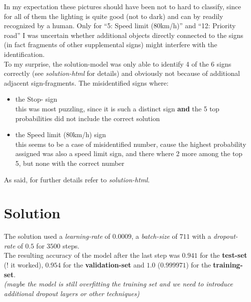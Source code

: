 \documentclass[a4paper]{article}
\begin{document}
In my expectation these pictures should have been not to hard to classify, since
for all of them the lighting is quite good (not to dark) and can by readily recognized by a human.
Only for \enquote{5: Speed limit (80km/h)} and \enquote{12: Priority road} I was uncertain
whether additional objects directly connected to the signs (in fact fragments of other supplemental signs)
might interfere with the identification.
\\
To my surprise, the solution-model was only able to identify 4 of the 6 signs correctly
(see \textit{solution-html} for details) and obviously not because of additional adjacent sign-fragments.
The misidentified signs where:
\begin{itemize}
\item the Stop- sign \\
this was most puzzling, since it is such a distinct sign \textbf{and} the 5 top probabilities did not include the correct solution
\item the Speed limit (80km/h) sign \\
this seems to be a case of misidentified number, cause the highest probability assigned was also a speed limit sign,
and there where 2 more among the top 5, but none with the correct number
\end{itemize}

As said, for further details refer to \textit{solution-html}.

\section{Solution}

The solution used a \textit{learning-rate} of $0.0009$, a \textit{batch-size} of $711$
with a \textit{dropout-rate} of $0.5$ for $3500$ steps.\\
The resulting accuracy of the model after the last step was $0.941$ for the
\textbf{test-set} (! it worked), $0.954$ for the \textbf{validation-set}
and $1.0$ ($0.999971$) for the \textbf{training-set}.\\
\textit{(maybe the model is still overfitting the training set and we need to
introduce additional dropout layers or other techniques)}\\
\end{document}
